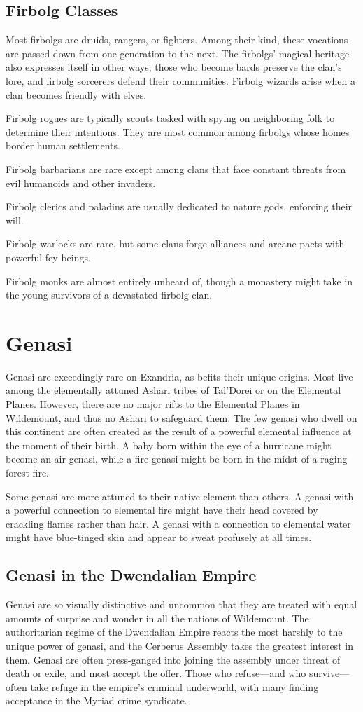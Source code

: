 \documentclass[10pt,a4paper,twoside,bg=print,twocolumn,openany,nodeprecatedcode]{dndbook}
\begin{document}
\subsection{Firbolg Classes}
Most firbolgs are druids, rangers, or fighters. Among their kind, these vocations are passed down from one generation to the next. The firbolgs' magical heritage also expresses itself in other ways; those who become bards preserve the clan's lore, and firbolg sorcerers defend their communities. Firbolg wizards arise when a clan becomes friendly with elves.

Firbolg rogues are typically scouts tasked with spying on neighboring folk to determine their intentions. They are most common among firbolgs whose homes border human settlements.

Firbolg barbarians are rare except among clans that face constant threats from evil humanoids and other invaders.

Firbolg clerics and paladins are usually dedicated to nature gods, enforcing their will.

Firbolg warlocks are rare, but some clans forge alliances and arcane pacts with powerful fey beings.

Firbolg monks are almost entirely unheard of, though a monastery might take in the young survivors of a devastated firbolg clan.

\section{Genasi}
Genasi are exceedingly rare on Exandria, as befits their unique origins. Most live among the elementally attuned Ashari tribes of Tal'Dorei or on the Elemental Planes. However, there are no major rifts to the Elemental Planes in Wildemount, and thus no Ashari to safeguard them. The few genasi who dwell on this continent are often created as the result of a powerful elemental influence at the moment of their birth. A baby born within the eye of a hurricane might become an air genasi, while a fire genasi might be born in the midst of a raging forest fire.

Some genasi are more attuned to their native element than others. A genasi with a powerful connection to elemental fire might have their head covered by crackling flames rather than hair. A genasi with a connection to elemental water might have blue-tinged skin and appear to sweat profusely at all times.

\subsection{Genasi in the Dwendalian Empire}
Genasi are so visually distinctive and uncommon that they are treated with equal amounts of surprise and wonder in all the nations of Wildemount. The authoritarian regime of the Dwendalian Empire reacts the most harshly to the unique power of genasi, and the Cerberus Assembly takes the greatest interest in them. Genasi are often press-ganged into joining the assembly under threat of death or exile, and most accept the offer. Those who refuse—and who survive—often take refuge in the empire's criminal underworld, with many finding acceptance in the Myriad crime syndicate.
\end{document}
